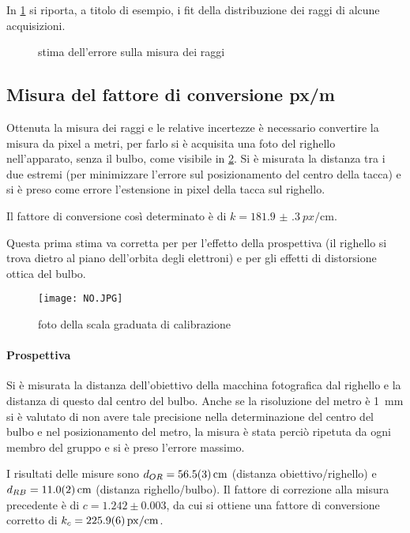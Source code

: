 In \figurename{ \ref{gauss}} si riporta, a titolo di esempio, i fit della distribuzione dei raggi di alcune acquisizioni.

\begin{figure}[H]
	\centering
	\caption{stima dell'errore sulla misura dei raggi}
	\label{gauss}
\end{figure}

\subsection{Misura del fattore di conversione px/m}

Ottenuta la misura dei raggi e le relative incertezze è necessario convertire la misura da pixel a metri, per farlo si è acquisita una foto del righello nell'apparato, senza il bulbo, come visibile in \figurename{ \ref{righello}}. Si è misurata la distanza tra i due estremi (per minimizzare l'errore sul posizionamento del centro della tacca) e si è preso come errore l'estensione in pixel della tacca sul righello.

Il fattore di conversione così determinato è di $k = \SI{181.9(3)}{px/\cm}$.

Questa prima stima va corretta per per l'effetto della prospettiva (il righello si trova dietro al piano dell'orbita degli elettroni) e per gli effetti di distorsione ottica del bulbo.

\begin{figure}[H]
	\centering
	\texttt{[image: NO.JPG]}
	\caption{foto della scala graduata di calibrazione}
	\label{righello}
\end{figure}

\paragraph{Prospettiva}	Si è misurata la distanza dell'obiettivo della macchina fotografica dal righello e la distanza di questo dal centro del bulbo. Anche se la risoluzione del metro è \SI{1}{\mm} si è valutato di non avere tale precisione nella determinazione del centro del bulbo e nel posizionamento del metro, la misura è stata perciò ripetuta da ogni membro del gruppo e si è preso l'errore massimo. 

I risultati delle misure sono $d_{OR} = \SI{56.5 \pm 0.3}{\cm}$ (distanza obiettivo/righello) e $d_{RB} = \SI{11 \pm 0.2}{\cm}$ (distanza righello/bulbo).
Il fattore di correzione alla misura precedente è di $c = {1.242 \pm 0.003}$, da cui si ottiene una fattore di conversione corretto di $k_c = \SI{225.9 \pm 0.6}{px/\cm}$.

